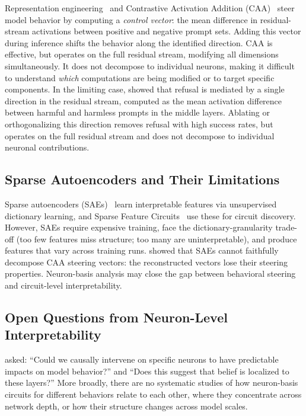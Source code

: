 \documentclass[11pt]{article}
\begin{document}
Representation engineering~\citep{zou2023representation} and Contrastive Activation Addition (CAA)~\citep{rimsky2024steering} steer model behavior by computing a \emph{control vector}: the mean difference in residual-stream activations between positive and negative prompt sets.
Adding this vector during inference shifts the behavior along the identified direction.
CAA is effective, but operates on the full residual stream, modifying all dimensions simultaneously.
It does not decompose to individual neurons, making it difficult to understand \emph{which} computations are being modified or to target specific components.
In the limiting case, \citet{arditi2024refusal} showed that refusal is mediated by a single direction in the residual stream, computed as the mean activation difference between harmful and harmless prompts in the middle layers.
Ablating or orthogonalizing this direction removes refusal with high success rates, but operates on the full residual stream and does not decompose to individual neuronal contributions.

\subsection{Sparse Autoencoders and Their Limitations}
\label{sec:bg_sae}

Sparse autoencoders (SAEs)~\citep{cunningham2023sae, bricken2023monosemanticity, templeton2024scaling} learn interpretable features via unsupervised dictionary learning, and Sparse Feature Circuits~\citep{marks2024sparse} use these for circuit discovery.
However, SAEs require expensive training, face the dictionary-granularity trade-off (too few features miss structure; too many are uninterpretable), and produce features that vary across training runs.
\citet{mayne2024sae_steering} showed that SAEs cannot faithfully decompose CAA steering vectors: the reconstructed vectors lose their steering properties.
Neuron-basis analysis may close the gap between behavioral steering and circuit-level interpretability.

\subsection{Open Questions from Neuron-Level Interpretability}
\label{sec:bg_open}

\citet{chalnick2025goodfire} asked: ``Could we causally intervene on specific neurons to have predictable impacts on model behavior?'' and ``Does this suggest that belief is localized to these layers?''
More broadly, there are no systematic studies of how neuron-basis circuits for different behaviors relate to each other, where they concentrate across network depth, or how their structure changes across model scales.
\end{document}
